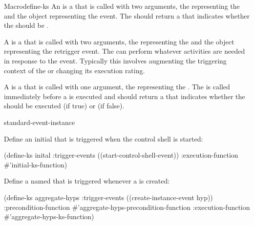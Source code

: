 \documentclass[10pt,twoside,english,pdftex]{article}
\begin{document}
\begin{functiondoc}{Macro}{define-ks}
An  is a  that is called with two
arguments, the  representing the  and the
object representing the  event.  The 
should return a  that indicates whether the
 should be .

A  is a  that is called with
two arguments, the  representing the 
and the object representing the retrigger event.  The
 can perform whatever activities are needed
in response to the event.  Typically this involves augmenting the
triggering context of the  or changing its execution rating.

A  is a  that is called with one
argument, the  representing the .  The
 is called immediately before a  is
executed and should return a  that indicates
whether the  should be executed (if true) or  (if
false).

\begin{alsos}{standard-event-instance}
\also[describe-ks]
\also[ensure-ks]
\also[ks]
\also[ks-enabled-p]
\also[undefine-ks]
\end{alsos}

\fnexamples
Define an initial  that is triggered when the control shell is started:
\begin{example}
  (define-ks inital
     :trigger-events ((start-control-shell-event)) 
     :execution-function #'initial-ks-function)
\end{example}

Define a  named  that is triggered whenever a
  is created:
\begin{example}
  (define-ks aggregate-hyps
     :trigger-events ((create-instance-event hyp))
     :precondition-function #'aggregate-hyps-precondition-function
     :execution-function #'aggregate-hyps-ks-function)
\end{example}

\fnnote
\instancekstriggersnyi

\end{functiondoc}

\end{document}
